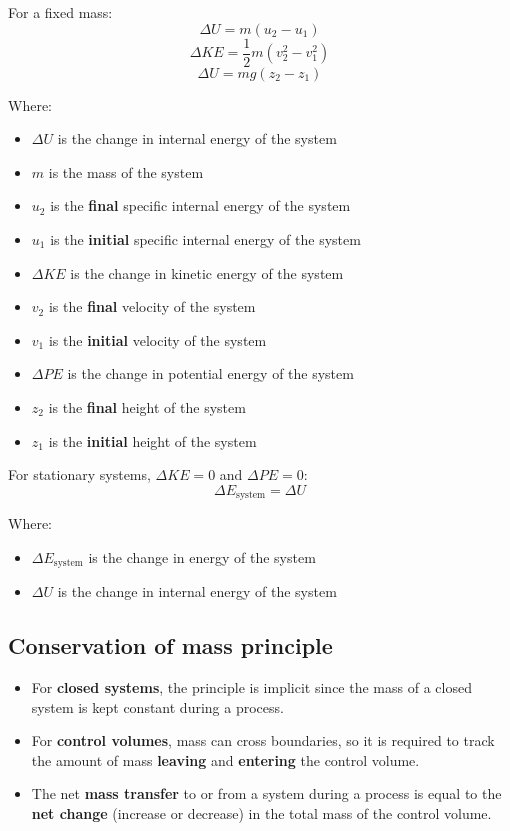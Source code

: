 \documentclass[11pt]{article}
\begin{document}
For a fixed mass:
\[\Delta U = m (u_2 - u_1)\]
\[\Delta KE = \frac{1}{2} m (v_2^2 - v_1^2)\]
\[\Delta U = mg (z_2 - z_1)\]

Where:
\begin{itemize}
\item \(\Delta U\) is the change in internal energy of the system
\item \(m\) is the mass of the system
\item \(u_2\) is the \textbf{final} specific internal energy of the system
\item \(u_1\) is the \textbf{initial} specific internal energy of the system
\item \(\Delta KE\) is the change in kinetic energy of the system
\item \(v_2\) is the \textbf{final} velocity of the system
\item \(v_1\) is the \textbf{initial} velocity of the system
\item \(\Delta PE\) is the change in potential energy of the system
\item \(z_2\) is the \textbf{final} height of the system
\item \(z_1\) is the \textbf{initial} height of the system
\end{itemize}

For stationary systems, \(\Delta KE = 0\) and \(\Delta PE = 0\):
\[\Delta E_{\text{system}} = \Delta U\]

Where:
\begin{itemize}
\item \(\Delta E_{\text{system}}\) is the change in energy of the system
\item \(\Delta U\) is the change in internal energy of the system
\end{itemize}
\subsection{Conservation of mass principle}
\label{sec:org1bad184}
\begin{itemize}
\item For \textbf{closed systems}, the principle is implicit since the mass of a closed system is kept constant during a process.
\item For \textbf{control volumes}, mass can cross boundaries, so it is required to track the amount of mass \textbf{leaving} and \textbf{entering} the control volume.
\item The net \textbf{mass transfer} to or from a system during a process is equal to the \textbf{net change} (increase or decrease) in the total mass of the control volume.
\end{itemize}
\end{document}
